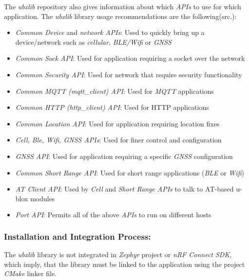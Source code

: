 \documentclass[report.tex]{subfiles}
\begin{document}
The \textit{ubxlib} repository\cite{ubx_lib} also gives information about which \textit{APIs} to use for which application. The \textit{ubxlib} library usage recommendations are the following(src.\cite{ubx_lib}):

\begin{itemize}
\item \textit{Common Device} and \textit{network} \textit{APIs}: Used to quickly bring up a device/network such as \textit{cellular}, \textit{BLE/Wifi} or \textit{GNSS}
\item \textit{Common Sock API}: Used for application requiring a socket over the network
\item \textit{Common Security API}: Used for network that require security functionality
\item \textit{Common MQTT (mqtt\_client) API}: Used for \textit{MQTT} applications
\item \textit{Common HTTP (http\_client) API}: Used for HTTP applications
\item \textit{Common Location API}: Used for application requiring location fixes
\item \textit{Cell, Ble, Wifi, GNSS APIs}: Used for finer control and configuration
\item \textit{GNSS API}: Used for application requiring a specific \textit{GNSS} configuration
\item \textit{Common Short Range API}: Used for short range applications (\textit{BLE} or \textit{Wifi})
\item \textit{AT Client API}: Used by \textit{Cell} and \textit{Short Range APIs} to talk to AT-based u-blox modules
\item \textit{Port API}: Permits all of the above \textit{APIs} to run on different hosts
\end{itemize}

\subsubsection{Installation and Integration Process:}
The \textit{ubxlib} library is not integrated in \textit{Zephyr} project or \textit{nRF Connect SDK}, which imply, that the library must be linked to the application using the project \textit{CMake} linker file.\\
\end{document}
